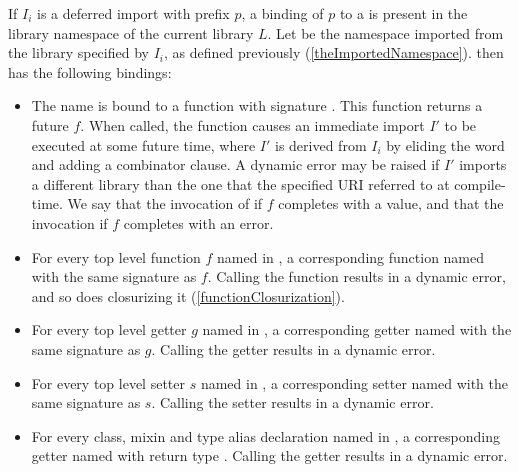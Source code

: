 \documentclass[makeidx]{article}
\begin{document}
{\LMHash{}%
If $I_i$ is a deferred import with prefix $p$, a binding of $p$ to a
 is
present in the library namespace of the current library $L$.
Let  be
the namespace imported from the library specified by $I_i$,
as defined previously
(\ref{theImportedNamespace}).
 then has the following bindings:

\begin{itemize}
\item The name  is bound to 
  a function with signature .
  This function returns a future $f$.
  When called, the function causes
  an immediate import $I'$ to be executed at some future time,
  where $I'$ is derived from $I_i$ by eliding the word \DEFERRED{}
  and adding a \HIDE{}  combinator clause.
  A dynamic error may be raised if $I'$ imports a different library
  than the one that the specified URI referred to at compile-time.
  We say that the invocation of 
   if $f$ completes with a value,
  and that the invocation
   if $f$ completes with an error.
\item
  For every top level function $f$ named \id{} in
  ,
  a corresponding function named \id{} with the same signature as $f$.
  Calling the function results in a dynamic error,
  and so does closurizing it
  (\ref{functionClosurization}).
\item
  For every top level getter $g$ named \id{} in
  ,
  a corresponding getter named \id{} with the same signature as $g$.
  Calling the getter results in a dynamic error.
\item
  For every top level setter $s$ named \code{\id=} in
  ,
  a corresponding setter named \code{\id=} with the same signature as $s$.
  Calling the setter results in a dynamic error.
\item
  For every class, mixin and type alias declaration named \id{} in
  ,
  a corresponding getter named \id{} with return type .
  Calling the getter results in a dynamic error.
\end{itemize}

}
\end{document}
